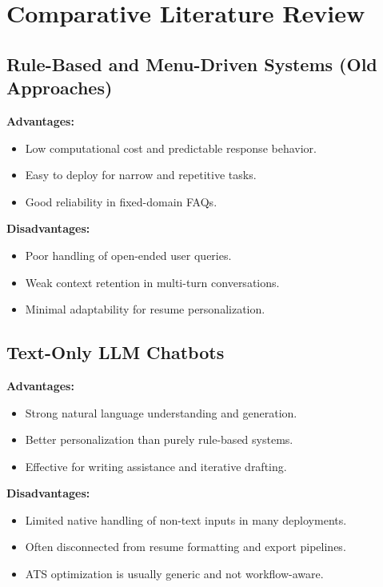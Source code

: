 \documentclass[conference]{IEEEtran}
\begin{document}
\section{Comparative Literature Review}
\subsection{Rule-Based and Menu-Driven Systems (Old Approaches)}
\textbf{Advantages:}
\begin{itemize}
    \item Low computational cost and predictable response behavior.
    \item Easy to deploy for narrow and repetitive tasks.
    \item Good reliability in fixed-domain FAQs.
\end{itemize}
\textbf{Disadvantages:}
\begin{itemize}
    \item Poor handling of open-ended user queries.
    \item Weak context retention in multi-turn conversations.
    \item Minimal adaptability for resume personalization.
\end{itemize}

\subsection{Text-Only LLM Chatbots}
\textbf{Advantages:}
\begin{itemize}
    \item Strong natural language understanding and generation.
    \item Better personalization than purely rule-based systems.
    \item Effective for writing assistance and iterative drafting.
\end{itemize}
\textbf{Disadvantages:}
\begin{itemize}
    \item Limited native handling of non-text inputs in many deployments.
    \item Often disconnected from resume formatting and export pipelines.
    \item ATS optimization is usually generic and not workflow-aware.
\end{itemize}
\end{document}
